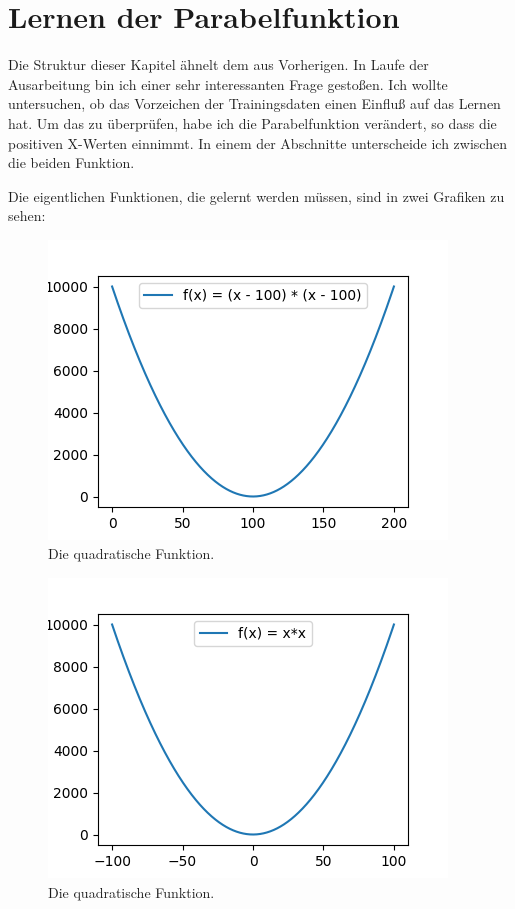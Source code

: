 \section{Lernen der Parabelfunktion}

Die Struktur dieser Kapitel ähnelt dem aus Vorherigen. In Laufe der Ausarbeitung bin ich einer sehr interessanten Frage gestoßen. Ich wollte untersuchen, ob das Vorzeichen der Trainingsdaten einen Einfluß auf das Lernen hat. Um das zu überprüfen, habe ich die Parabelfunktion verändert, so dass die positiven X-Werten einnimmt. In einem der Abschnitte unterscheide ich zwischen die beiden Funktion.

Die eigentlichen Funktionen, die gelernt werden müssen, sind in zwei Grafiken zu sehen:
\begin{figure}
	\centering
	\includegraphics{images/parabola_positive.png}
	\caption{Die quadratische Funktion.}
\end{figure}
\begin{figure}
	\centering
	\includegraphics{images/parabola.png}
	\caption{Die quadratische Funktion.}
\end{figure}

